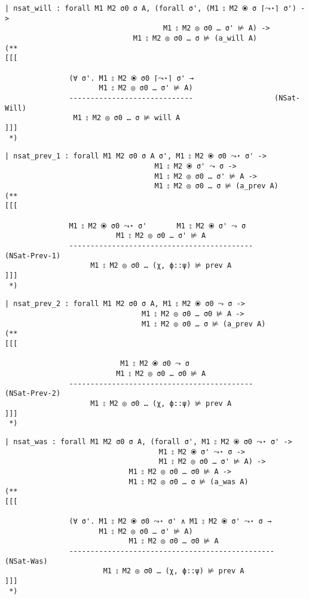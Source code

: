 \documentclass[12pt]{article}
\begin{document}
\begin{verbatim}
| nsat_will : forall M1 M2 σ0 σ A, (forall σ', (M1 ⦂ M2 ⦿ σ ⌈⤳⋆⌉ σ') ->
                                     M1 ⦂ M2 ◎ σ0 … σ' ⊭ A) ->
                              M1 ⦂ M2 ◎ σ0 … σ ⊭ (a_will A)
(**
[[[
                    
               (∀ σ'. M1 ⦂ M2 ⦿ σ0 ⌈⤳⋆⌉ σ' →
                      M1 ⦂ M2 ◎ σ0 … σ' ⊭ A)
               -----------------------------                   (NSat-Will)
                M1 ⦂ M2 ◎ σ0 … σ ⊭ will A
]]]
 *)
\end{verbatim}
\begin{verbatim}
| nsat_prev_1 : forall M1 M2 σ0 σ A σ', M1 ⦂ M2 ⦿ σ0 ⤳⋆ σ' ->
                                   M1 ⦂ M2 ⦿ σ' ⤳ σ ->
                                   M1 ⦂ M2 ◎ σ0 … σ' ⊭ A ->
                                   M1 ⦂ M2 ◎ σ0 … σ ⊭ (a_prev A)
(**
[[[
                    
               M1 ⦂ M2 ⦿ σ0 ⤳⋆ σ'       M1 ⦂ M2 ⦿ σ' ⤳ σ
                          M1 ⦂ M2 ◎ σ0 … σ' ⊭ A
               -------------------------------------------                   (NSat-Prev-1)
                    M1 ⦂ M2 ◎ σ0 … (χ, ϕ::ψ) ⊭ prev A
]]]
 *)
\end{verbatim}
\begin{verbatim}
| nsat_prev_2 : forall M1 M2 σ0 σ A, M1 ⦂ M2 ⦿ σ0 ⤳ σ ->
                                M1 ⦂ M2 ◎ σ0 … σ0 ⊭ A ->
                                M1 ⦂ M2 ◎ σ0 … σ ⊭ (a_prev A)
(**
[[[
                    
                           M1 ⦂ M2 ⦿ σ0 ⤳ σ
                          M1 ⦂ M2 ◎ σ0 … σ0 ⊭ A
               -------------------------------------------                   (NSat-Prev-2)
                    M1 ⦂ M2 ◎ σ0 … (χ, ϕ::ψ) ⊭ prev A
]]]
 *)
\end{verbatim}
\begin{verbatim}
| nsat_was : forall M1 M2 σ0 σ A, (forall σ', M1 ⦂ M2 ⦿ σ0 ⤳⋆ σ' ->
                                    M1 ⦂ M2 ⦿ σ' ⤳⋆ σ ->
                                    M1 ⦂ M2 ◎ σ0 … σ' ⊭ A) ->
                             M1 ⦂ M2 ◎ σ0 … σ0 ⊭ A ->
                             M1 ⦂ M2 ◎ σ0 … σ ⊭ (a_was A)
(**
[[[
                    
               (∀ σ'. M1 ⦂ M2 ⦿ σ0 ⤳⋆ σ' ∧ M1 ⦂ M2 ⦿ σ' ⤳⋆ σ →
                      M1 ⦂ M2 ◎ σ0 … σ' ⊭ A)
                             M1 ⦂ M2 ◎ σ0 … σ0 ⊭ A
               ------------------------------------------------                   (NSat-Was)
                       M1 ⦂ M2 ◎ σ0 … (χ, ϕ::ψ) ⊭ prev A
]]]
 *)
\end{verbatim}
\end{document}
